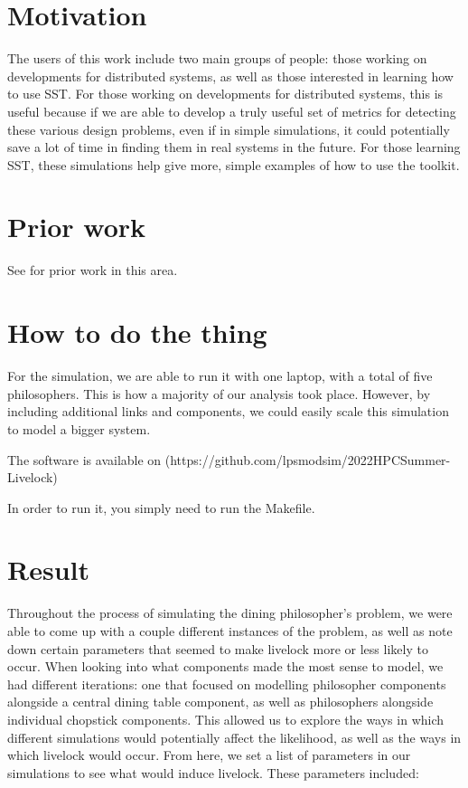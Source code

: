 \documentclass{article}
\begin{document}
\section{Motivation} %

The users of this work include two main groups of people: those working on developments for distributed 
systems, as well as those interested in learning how to use SST.  For those working on developments for distributed 
systems, this is useful because if we are able to develop a truly useful set of metrics for detecting these various design 
problems, even if in simple simulations, it could potentially save a lot of time in finding them in real systems in 
the future.  For those learning SST, these simulations help give more, simple examples of how to use the toolkit.

\section{Prior work} %

See \cite{texbook} for prior work in this area.

\section{How to do the thing}

For the simulation, we are able to run it with one laptop, with a total of five philosophers.  This is how a 
majority of our analysis took place.  However, by including additional links and components, we could easily 
scale this simulation to model a bigger system.

The software is available on (https://github.com/lpsmodsim/2022HPCSummer-Livelock)

In order to run it, you simply need to run the Makefile.

\section{Result} %

Throughout the process of simulating the dining philosopher's problem, we were able to come up with a couple different
instances of the problem, as well as note down certain parameters that seemed to make livelock more or less likely to 
occur.  When looking into what components made the most sense to model, we had different iterations: one that focused on 
modelling philosopher components alongside a central dining table component, as well as philosophers alongside individual 
chopstick components.  This allowed us to explore the ways in which different simulations would potentially affect the 
likelihood, as well as the ways in which livelock would occur.  From here, we set a list of parameters in our simulations  
to see what would induce livelock.  These parameters included:
\end{document}
